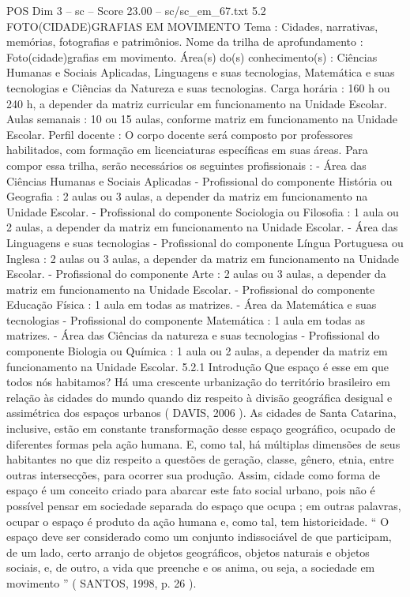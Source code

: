 \begin{textsample}{POS Dim 3 – sc – Score 23.00 – sc/sc\_em\_67.txt}  \label{ex:f3_pos_063}
5.2 FOTO(CIDADE)GRAFIAS EM MOVIMENTO Tema : Cidades, narrativas, memórias, fotografias e patrimônios.
Nome da trilha de aprofundamento : Foto(cidade)grafias em movimento.
Área(s) do(s) conhecimento(s) : Ciências Humanas e Sociais Aplicadas, Linguagens e suas tecnologias, Matemática e suas tecnologias e Ciências da Natureza e suas tecnologias.
Carga horária : 160 h ou 240 h, a depender da matriz curricular em funcionamento na Unidade Escolar.
Aulas semanais : 10 ou 15 aulas, conforme matriz em funcionamento na Unidade Escolar.
Perfil docente : O corpo docente será composto por professores habilitados, com formação em licenciaturas específicas em suas áreas.
Para compor essa trilha, serão necessários os seguintes profissionais : - Área das Ciências Humanas e Sociais Aplicadas - Profissional do componente História ou Geografia : 2 aulas ou 3 aulas, a depender da matriz em funcionamento na Unidade Escolar. - Profissional do componente Sociologia ou Filosofia : 1 aula ou 2 aulas, a depender da matriz em funcionamento na Unidade Escolar. - Área das Linguagens e suas tecnologias - Profissional do componente Língua Portuguesa ou Inglesa : 2 aulas ou 3 aulas, a depender da matriz em funcionamento na Unidade Escolar. - Profissional do componente Arte : 2 aulas ou 3 aulas, a depender da matriz em funcionamento na Unidade Escolar. - Profissional do componente Educação Física : 1 aula em todas as matrizes. - Área da Matemática e suas tecnologias - Profissional do componente Matemática : 1 aula em todas as matrizes. - Área das Ciências da natureza e suas tecnologias - Profissional do componente Biologia ou Química : 1 aula ou 2 aulas, a depender da matriz em funcionamento na Unidade Escolar. 5.2.1 Introdução Que espaço é esse em que todos nós habitamos?
Há uma crescente urbanização do território brasileiro em relação às cidades do mundo quando diz respeito à divisão geográfica desigual e assimétrica dos espaços urbanos ( DAVIS, 2006 ).
As cidades de Santa Catarina, inclusive, estão em constante transformação desse espaço geográfico, ocupado de diferentes formas pela ação humana.
E, como tal, há múltiplas dimensões de seus habitantes no que diz respeito a questões de geração, classe, gênero, etnia, entre outras intersecções, para ocorrer sua produção.
Assim, cidade como forma de espaço é um conceito criado para abarcar este fato social urbano, pois não é possível pensar em sociedade separada do espaço que ocupa ; em outras palavras, ocupar o espaço é produto da ação humana e, como tal, tem historicidade. “ O espaço deve ser considerado como um conjunto indissociável de que participam, de um lado, certo arranjo de objetos geográficos, objetos naturais e objetos sociais, e, de outro, a vida que preenche e os anima, ou seja, a sociedade em movimento ” ( SANTOS, 1998, p. 26 ).

\end{textsample}
